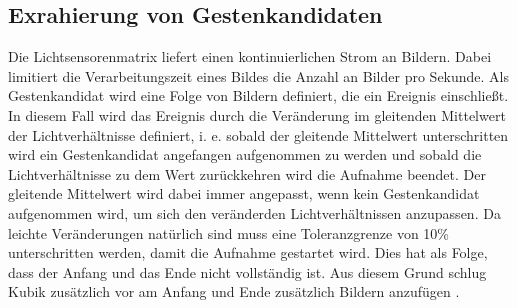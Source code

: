 \subsection{Exrahierung von Gestenkandidaten}
Die Lichtsensorenmatrix liefert einen kontinuierlichen Strom an Bildern. Dabei limitiert die Verarbeitungszeit eines Bildes die Anzahl an Bilder pro Sekunde. Als Gestenkandidat wird eine Folge von Bildern definiert, die
ein Ereignis einschließt. In diesem Fall wird das Ereignis durch die Veränderung im gleitenden Mittelwert der Lichtverhältnisse definiert, i. e. sobald der gleitende Mittelwert unterschritten wird ein Gestenkandidat
angefangen aufgenommen zu werden und sobald die Lichtverhältnisse zu dem Wert zurückkehren wird die Aufnahme beendet. Der gleitende Mittelwert wird dabei immer angepasst, wenn kein Gestenkandidat aufgenommen wird, um
sich den veränderden Lichtverhältnissen anzupassen. Da leichte Veränderungen natürlich sind muss eine Toleranzgrenze von 10\% unterschritten werden, damit die Aufnahme gestartet wird. Dies hat als Folge, dass der Anfang
und das Ende nicht vollständig ist. Aus diesem Grund schlug Kubik zusätzlich vor am Anfang und Ende zusätzlich Bildern anzufügen \cite{kubikThesis}.
\newline
\newline
